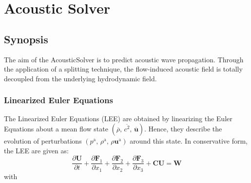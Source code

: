 \chapter{Acoustic Solver}

\section{Synopsis}
The aim of the AcousticSolver is to predict acoustic wave propagation.
Through the application of a splitting technique, the flow-induced acoustic field is
totally decoupled from the underlying hydrodynamic field.

\subsection{Linearized Euler Equations}
The Linearized Euler Equations (LEE) are obtained by linearizing the Euler Equations about a mean flow state $\left( \overline{\rho},\,\overline{c^2},\,\overline{\boldsymbol{u}} \right)$.
Hence, they describe the evolution of perturbations $\left(p^\mathrm{a},\,\rho^\mathrm{a},\,\rho\boldsymbol{u}^\mathrm{a} \right)$ around this state.
In conservative form, the LEE are given as:
\begin{equation} 
\frac{\partial \boldsymbol{U}}{\partial t}
+ \frac{\partial \boldsymbol{F}_1}{\partial x_1}
+ \frac{\partial \boldsymbol{F}_2}{\partial x_2}
+ \frac{\partial \boldsymbol{F}_3}{\partial x_3}
    + \boldsymbol{C}   \boldsymbol{U}
= \boldsymbol{W}
\end{equation}
with
